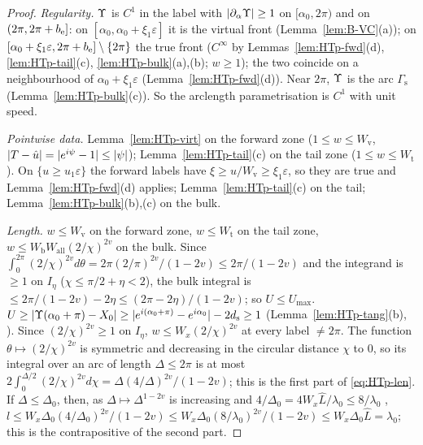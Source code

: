 \begin{proof}
\emph{Regularity.} $\Upsilon$ is $C^1$ in the label with $|\partial_\alpha\Upsilon|\ge1$ on $[\alpha_0,2\pi)$ and on $(2\pi,2\pi+b_{\mathrm e}]$: on
$[\alpha_0,\alpha_0+\xi_1\varepsilon]$ it is the virtual front (Lemma~\ref{lem:B-VC}(a)); on $[\alpha_0+\xi_1\varepsilon,2\pi+b_{\mathrm e}]\setminus\{2\pi\}$
the true front ($C^\infty$ by Lemmas~\ref{lem:HTp-fwd}(d), \ref{lem:HTp-tail}(c), \ref{lem:HTp-bulk}(a),(b); $w\ge1$); the two coincide on
a neighbourhood of $\alpha_0+\xi_1\varepsilon$ (Lemma~\ref{lem:HTp-fwd}(d)). Near $2\pi$, $\Upsilon$ is the arc $\Gamma_{\mathrm s}$
(Lemma~\ref{lem:HTp-bulk}(c)). So the arclength parametrisation is $C^1$ with unit speed.

\emph{Pointwise data.} Lemma~\ref{lem:HTp-virt} on the forward zone ($1\le w\le W_{\mathrm v}$, $|T-\hat u|=|e^{i\psi}-1|\le|\psi|$);
Lemma~\ref{lem:HTp-tail}(c) on the tail zone ($1\le w\le W_{\mathrm t}$). On $\{u\ge u_1\varepsilon\}$ the forward labels have
$\xi\ge u/W_{\mathrm v}\ge\xi_1\varepsilon$, so they are true and Lemma~\ref{lem:HTp-fwd}(d) applies; Lemma~\ref{lem:HTp-tail}(c) on the
tail; Lemma~\ref{lem:HTp-bulk}(b),(c) on the bulk.

\emph{Length.} $w\le W_{\mathrm v}$ on the forward zone, $w\le W_{\mathrm t}$ on the tail zone, $w\le W_{\mathrm b}W_{\mathrm{all}}(2/\chi)^{2v}$ on
the bulk. Since $\int_0^{2\pi}(2/\chi)^{2v}d\theta=2\pi(2/\pi)^{2v}/(1-2v)\le2\pi/(1-2v)$ and the integrand is $\ge1$ on $I_\eta$ ($\chi\le
\pi/2+\eta<2$), the bulk integral is $\le2\pi/(1-2v)-2\eta\le(2\pi-2\eta)/(1-2v)$; so $U\le U_{\max}$. $U\ge|\Upsilon(\alpha_0+\pi)-X_0|\ge
|e^{i(\alpha_0+\pi)}-e^{i\alpha_0}|-2d_{\mathrm s}\ge1$ (Lemma~\ref{lem:HTp-tang}(b), ). Since $(2/\chi)^{2v}\ge1$ on $I_\eta$,
$w\le W_x(2/\chi)^{2v}$ at every label $\ne2\pi$. The function $\theta\mapsto(2/\chi)^{2v}$ is symmetric and decreasing in the circular
distance $\chi$ to $0$, so its integral over an arc of length $\Delta\le2\pi$ is at most $2\int_0^{\Delta/2}(2/\chi)^{2v}d\chi=
\Delta(4/\Delta)^{2v}/(1-2v)$; this is the first part of \eqref{eq:HTp-len}. If $\Delta\le\Delta_0$, then, as $\Delta\mapsto\Delta^{1-2v}$ is
increasing and $4/\Delta_0=4W_x\hat L/\lambda_0\le8/\lambda_0$ ,
$l\le W_x\Delta_0(4/\Delta_0)^{2v}/(1-2v)\le W_x\Delta_0(8/\lambda_0)^{2v}/(1-2v)\le W_x\Delta_0\hat L=\lambda_0$; this is the contrapositive of
the second part.
\end{proof}

